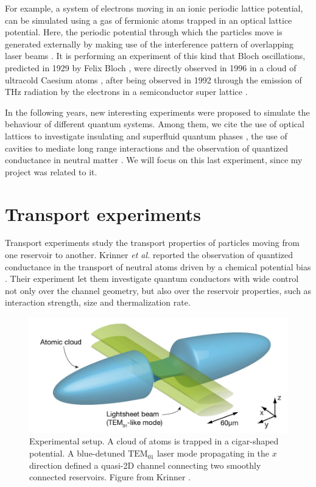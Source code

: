 For example, a system of electrons moving in an ionic periodic lattice potential, can be simulated using a gas of fermionic atoms trapped in an optical lattice potential. Here, the periodic potential
through which the particles move is generated externally by making
use of the interference pattern of overlapping laser beams \cite{bloch2008}. It is performing an experiment of this kind that Bloch oscillations, predicted in 1929 by Felix Bloch \cite{bloch1929a}, were directly observed in 1996 in a cloud of ultracold Caesium atoms \cite{dahan1996}, after being observed in 1992 through the emission of THz radiation by the electrons in a semiconductor super lattice \cite{feldmann1992}.

In the following years, new interesting experiments were proposed to simulate the behaviour of different quantum systems. Among them, we cite the use of optical lattices to investigate insulating and superfluid quantum phases \cite{greiner2002}, the use of cavities to mediate long range interactions \cite{landig2016} and the observation of quantized conductance in neutral matter \cite{krinner2015}. We will focus on this last experiment, since my project was related to it.

\section{Transport experiments}
Transport experiments study the transport properties of particles moving from one reservoir to another. Krinner \emph{et al.} reported the observation of quantized conductance in the transport of neutral atoms driven by a chemical potential bias \cite{krinner2015}. Their experiment let them investigate
quantum conductors with wide control not only over the channel
geometry, but also over the reservoir properties, such as interaction strength, size and thermalization rate.

\begin{figure}
    \includegraphics[width=\textwidth]{chapters/chapter_1/figures/reservoir.png}
    \caption{Experimental setup. A cloud of atoms is trapped in a cigar-shaped potential. A blue-detuned $\text{TEM}_{01}$ laser mode propagating in the $x$ direction defined a quasi-2D channel connecting two smoothly connected reservoirs. Figure from Krinner \cite{krinner2015b}.}
    \label{fig:lithium_apparatus}
\end{figure}

